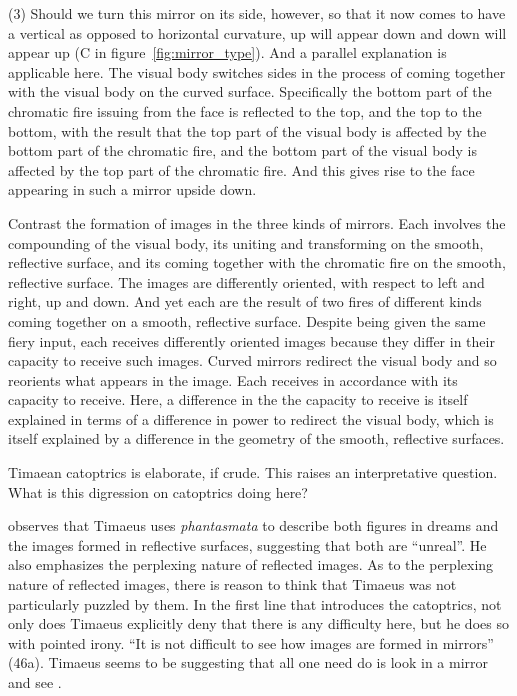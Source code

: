(3) Should we turn this mirror on its side, however, so that it now comes to have a vertical as opposed to horizontal curvature, up will appear down and down will appear up (C in figure~\ref{fig:mirror_type}). And a parallel explanation is applicable here. The visual body switches sides in the process of coming together with the visual body on the curved surface. Specifically the bottom part of the chromatic fire issuing from the face is reflected to the top, and the top to the bottom, with the result that the top part of the visual body is affected by the bottom part of the chromatic fire, and the bottom part of the visual body is affected by the top part of the chromatic fire. And this gives rise to the face appearing in such a mirror upside down.

Contrast the formation of images in the three kinds of mirrors. Each involves the compounding of the visual body, its uniting and transforming on the smooth, reflective surface, and its coming together with the chromatic fire on the smooth, reflective surface. The images are differently oriented, with respect to left and right, up and down. And yet each are the result of two fires of different kinds coming together on a smooth, reflective surface. Despite being given the same fiery input, each receives differently oriented images because they differ in their capacity to receive such images. Curved mirrors redirect the visual body and so reorients what appears in the image. Each receives in accordance with its capacity to receive. Here, a difference in the the capacity to receive is itself explained in terms of a difference in power to redirect the visual body, which is itself explained by a difference in the geometry of the smooth, reflective surfaces.

Timaean catoptrics is elaborate, if crude. This raises an interpretative question. What is this digression on catoptrics doing here? 

\citet[285]{Taylor:1928qb} observes that Timae\-us uses \emph{phantasmata} to describe both figures in dreams and the images formed in reflective surfaces, suggesting that both are ``unreal''. He also emphasizes the perplexing nature of reflected images. As to the perplexing nature of reflected images, there is reason to think that Timaeus was not particularly puzzled by them. In the first line that introduces the catoptrics, not only does Timaeus explicitly deny that there is any difficulty here, but he does so with pointed irony. ``It is not difficult to see how images are formed in mirrors'' (46a). Timaeus seems to be suggesting that all one need do is look in a mirror and see \citep[47]{Burnyeat:2005rc}. 

